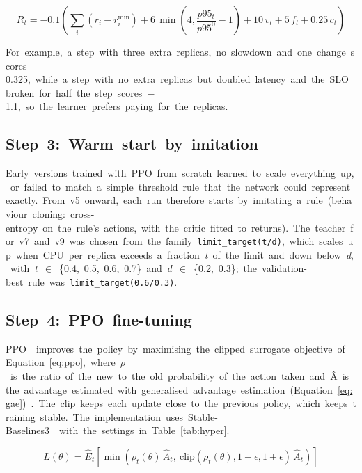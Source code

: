 \documentclass[12pt,a4paper,oneside]{report}
\begin{document}
\begin{equation}\label{eq:reward}
R_t = -0.1\left(\sum_i (r_i - r_i^{\min}) + 6\,\min\left(4, \frac{p95_t}{p95^{0}} - 1\right) + 10\,v_t + 5\,f_t + 0.25\,c_t\right)
\end{equation}

For~example,~a~step~with~three~extra~replicas,~no~slowdown~and~one~change~scores~$-$0.325,~while~a~step~with~no~extra~replicas~but~doubled~latency~and~the~SLO~broken~for~half~the~step~scores~$-$1.1,~so~the~learner~prefers~paying~for~the~replicas.


\subsection{Step~3:~Warm~start~by~imitation}

Early~versions~trained~with~PPO~from~scratch~learned~to~scale~everything~up,~or~failed~to~match~a~simple~threshold~rule~that~the~network~could~represent~exactly.~From~v5~onward,~each~run~therefore~starts~by~imitating~a~rule~(behaviour~cloning:~cross-entropy~on~the~rule's~actions,~with~the~critic~fitted~to~returns).~The~teacher~for~v7~and~v9~was~chosen~from~the~family~\texttt{limit\_\allowbreak{}target(t/\allowbreak{}d)},~which~scales~up~when~CPU~per~replica~exceeds~a~fraction~\textit{t}~of~the~limit~and~down~below~\textit{d},~with~\textit{t}~$\in$~\{0.4,~0.5,~0.6,~0.7\}~and~\textit{d}~$\in$~\{0.2,~0.3\};~the~validation-best~rule~was~\texttt{limit\_\allowbreak{}target(0.\allowbreak{}6/\allowbreak{}0.\allowbreak{}3)}.


\subsection{Step~4:~PPO~fine-tuning}

PPO~\cite{ppo}~improves~the~policy~by~maximising~the~clipped~surrogate~objective~of~Equation~\ref{eq:ppo},~where~$\rho$~is~the~ratio~of~the~new~to~the~old~probability~of~the~action~taken~and~\^{A}~is~the~advantage~estimated~with~generalised~advantage~estimation~(Equation~\ref{eq:gae})~\cite{gae}.~The~clip~keeps~each~update~close~to~the~previous~policy,~which~keeps~training~stable.~The~implementation~uses~Stable-Baselines3~\cite{sb3}~with~the~settings~in~Table~\ref{tab:hyper}.


\begin{equation}\label{eq:ppo}
L(\theta) = \hat{E}_t\left[\min\left(\rho_t(\theta)\,\hat{A}_t,\ \mathrm{clip}(\rho_t(\theta), 1-\epsilon, 1+\epsilon)\,\hat{A}_t\right)\right]
\end{equation}
\end{document}
